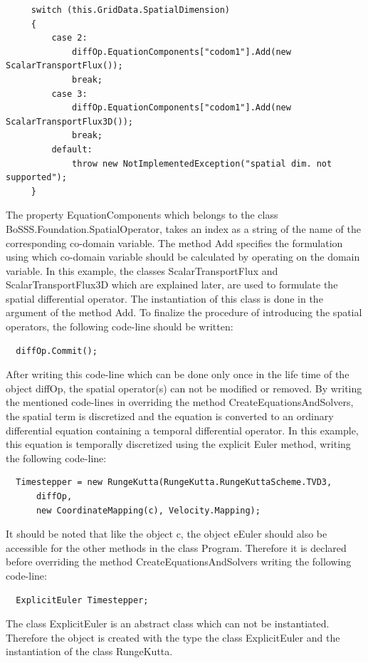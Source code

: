 \documentclass[11pt,twoside,a4paper]{fdyartcl}
\begin{document}
{{\scriptsize \begin{verbatim}
	 switch (this.GridData.SpatialDimension)
	 {
		 case 2:
			 diffOp.EquationComponents["codom1"].Add(new ScalarTransportFlux());
			 break;
		 case 3:
			 diffOp.EquationComponents["codom1"].Add(new ScalarTransportFlux3D());
			 break;
		 default:
			 throw new NotImplementedException("spatial dim. not supported");
	 }
	\end{verbatim}}
The property {\scriptsize EquationComponents} which belongs to the class {\scriptsize BoSSS.Foundation.SpatialOperator}, takes an index as a string of the name of the corresponding co-domain variable. The method {\scriptsize Add} specifies the formulation using which co-domain variable should be calculated by operating on the domain variable. In this example, the classes {\scriptsize ScalarTransportFlux} and {\scriptsize ScalarTransportFlux3D} which are explained later, are used to formulate the spatial differential operator. The instantiation of this class is done in the argument of the method {\scriptsize Add}. To finalize the procedure of introducing the spatial operators, the following code-line should be written:
{\scriptsize \begin{verbatim}
  diffOp.Commit();
\end{verbatim}}
After writing this code-line which can be done only once in the life time of the object {\scriptsize diffOp}, the spatial operator(s) can not be modified or removed. By writing the mentioned code-lines in overriding the method {\scriptsize CreateEquationsAndSolvers}, the spatial term is discretized and the equation is converted to an ordinary differential equation containing a temporal differential operator. In this example, this equation is temporally discretized using the explicit Euler method, writing the following code-line:
{\scriptsize \begin{verbatim}
  Timestepper = new RungeKutta(RungeKutta.RungeKuttaScheme.TVD3,
	  diffOp,
	  new CoordinateMapping(c), Velocity.Mapping);
\end{verbatim}}
It should be noted that like the object {\scriptsize c}, the object {\scriptsize eEuler} should also be accessible for the other methods in the class {\scriptsize Program}. Therefore it is declared before overriding the method {\scriptsize CreateEquationsAndSolvers} writing the following code-line:
{\scriptsize \begin{verbatim}
  ExplicitEuler Timestepper;
\end{verbatim}}
The class {\scriptsize ExplicitEuler} is an abstract class which can not be instantiated. Therefore the object is created with the type the class {\scriptsize ExplicitEuler} and the instantiation of the class {\scriptsize RungeKutta}.
}
\end{document}
